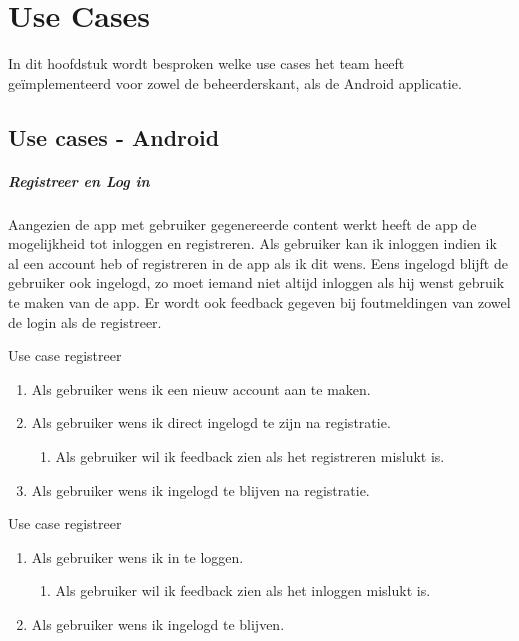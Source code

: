 \chapter{Use Cases}
\label{Use Cases}

In dit hoofdstuk wordt besproken welke use cases het team heeft geïmplementeerd voor zowel de beheerderskant, als de Android applicatie.

\section{Use cases - Android}

\paragraph{Registreer en Log in}
Aangezien de app met gebruiker gegenereerde content werkt heeft de app de mogelijkheid tot inloggen en registreren. Als gebruiker kan ik inloggen indien ik al een account heb of registreren in de app als ik dit wens. Eens ingelogd blijft de gebruiker ook ingelogd, zo moet iemand niet altijd inloggen als hij wenst gebruik te maken van de app. Er wordt ook feedback gegeven bij foutmeldingen van zowel de login als de registreer.

Use case registreer
\begin{enumerate}
	\item Als gebruiker wens ik een nieuw account aan te maken.
	\item Als gebruiker wens ik direct ingelogd te zijn na registratie.
		\begin{enumerate}
		\item Als gebruiker wil ik feedback zien als het registreren mislukt is.
	\end{enumerate}
	\item Als gebruiker wens ik ingelogd te blijven na registratie.
\end{enumerate}


Use case registreer
\begin{enumerate}
	\item Als gebruiker wens ik in te loggen.
	\begin{enumerate}
		\item Als gebruiker wil ik feedback zien als het inloggen mislukt is.
	\end{enumerate}
	\item Als gebruiker wens ik ingelogd te blijven.
\end{enumerate}

